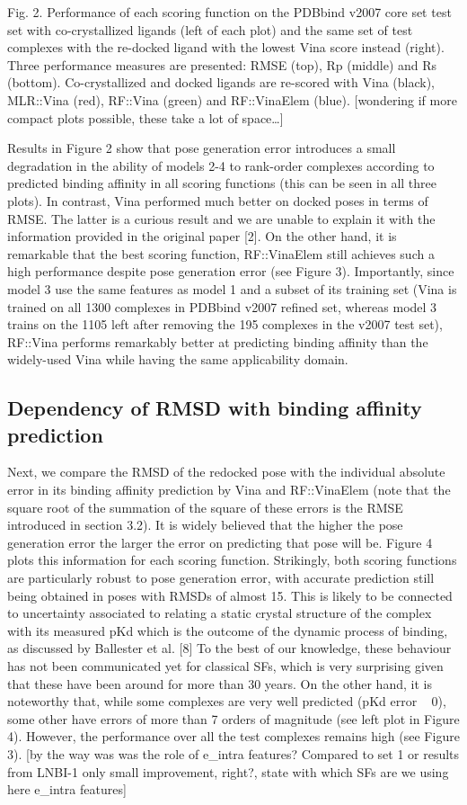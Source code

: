\documentclass[twocolumn]{bmcart}
\begin{document}
Fig. 2. Performance of each scoring function on the PDBbind v2007 core set test set with co-crystallized ligands (left of each plot) and the same set of test complexes with the re-docked ligand with the lowest Vina score instead (right). Three performance measures are presented: RMSE (top), Rp (middle) and Rs (bottom). Co-crystallized and docked ligands are re-scored with Vina (black), MLR::Vina (red), RF::Vina (green) and RF::VinaElem (blue). [wondering if more compact plots possible, these take a lot of space…]

Results in Figure 2 show that pose generation error introduces a small degradation in the ability of models 2-4 to rank-order complexes according to predicted binding affinity in all scoring functions (this can be seen in all three plots). In contrast, Vina performed much better on docked poses in terms of RMSE. The latter is a curious result and we are unable to explain it with the information provided in the original paper [2]. On the other hand, it is remarkable that the best scoring function, RF::VinaElem still achieves such a high performance despite pose generation error (see Figure 3). Importantly, since model 3 use the same features as model 1 and a subset of its training set (Vina is trained on all 1300 complexes in PDBbind v2007 refined set, whereas model 3 trains on the 1105 left after removing the 195 complexes in the v2007 test set), RF::Vina performs remarkably better at predicting binding affinity than the widely-used Vina while having the same applicability domain.

\subsection*{Dependency of RMSD with binding affinity prediction}

Next, we compare the RMSD of the redocked pose with the individual absolute error in its binding affinity prediction by Vina and RF::VinaElem (note that the square root of the summation of the square of these errors is the RMSE introduced in section 3.2). It is widely believed that the higher the pose generation error the larger the error on predicting that pose will be. Figure 4 plots this information for each scoring function. Strikingly, both scoring functions are particularly robust to pose generation error, with accurate prediction still being obtained in poses with RMSDs of almost 15. This is likely to be connected to uncertainty associated to relating a static crystal structure of the complex with its measured pKd which is the outcome of the dynamic process of binding, as discussed by Ballester et al. [8] To the best of our knowledge, these behaviour has not been communicated yet for classical SFs, which is very surprising given that these have been around for more than 30 years. On the other hand, it is noteworthy that, while some complexes are very well predicted (pKd error ~ 0), some other have errors of more than 7 orders of magnitude (see left plot in Figure 4). However, the performance over all the test complexes remains high (see Figure 3). [by the way was was the role of e_intra features? Compared to set 1 or results from LNBI-1 only small improvement, right?, state with which SFs are we using here e_intra features]
\end{document}
